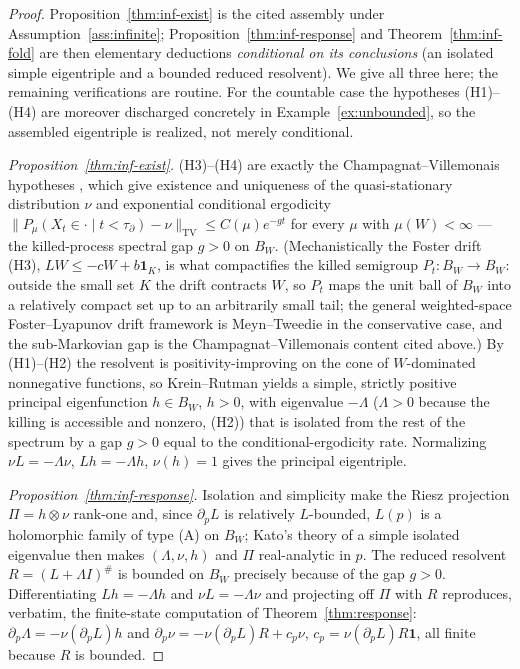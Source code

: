 \documentclass[11pt,reqno]{amsart}
\theoremstyle{plain}
\theoremstyle{definition}
\theoremstyle{remark}
\begin{document}
\begin{proof}
Proposition~\ref{thm:inf-exist} is the cited assembly under Assumption~\ref{ass:infinite};
Proposition~\ref{thm:inf-response} and Theorem~\ref{thm:inf-fold} are then elementary
deductions \emph{conditional on its conclusions} (an isolated simple eigentriple and a
bounded reduced resolvent). We give all three here; the remaining verifications are routine.
For the countable case the hypotheses (H1)--(H4) are moreover discharged concretely in
Example~\ref{ex:unbounded}, so the assembled eigentriple is realized, not merely conditional.

\emph{Proposition~\ref{thm:inf-exist}.} (H3)--(H4) are exactly the
Champagnat--Villemonais hypotheses
\cite{ChampagnatVillemonais2016,ChampagnatVillemonais2017}, which give existence and
uniqueness of the quasi-stationary distribution $\nu$ and exponential conditional
ergodicity $\|P_\mu(X_t\in\cdot\mid t<\tau_\partial)-\nu\|_{\mathrm{TV}}\le
C(\mu)e^{-gt}$ for every $\mu$ with $\mu(W)<\infty$ --- the killed-process spectral gap $g>0$ on
$B_W$. (Mechanistically the Foster drift (H3), $LW\le-cW+b\mathbf 1_K$, is what compactifies the
killed semigroup $P_t\colon B_W\to B_W$: outside the small set $K$ the drift contracts $W$, so $P_t$
maps the unit ball of $B_W$ into a relatively compact set up to an arbitrarily small tail; the general
weighted-space Foster--Lyapunov drift framework is Meyn--Tweedie \cite{MeynTweedie2009} in the
conservative case, and the sub-Markovian gap is the Champagnat--Villemonais content cited above.) By
(H1)--(H2) the resolvent is
positivity-improving on the cone of $W$-dominated nonnegative functions, so
Krein--Rutman \cite{KreinRutman1948} yields a simple, strictly positive principal
eigenfunction $h\in B_W$, $h>0$, with eigenvalue $-\Lambda$ ($\Lambda>0$ because the
killing is accessible and nonzero, (H2)) that is isolated from the rest of the
spectrum by a gap $g>0$ equal to the conditional-ergodicity rate. Normalizing
$\nu L=-\Lambda\nu$, $Lh=-\Lambda h$, $\nu(h)=1$ gives the principal eigentriple.

\emph{Proposition~\ref{thm:inf-response}.} Isolation and simplicity make the Riesz
projection $\Pi=h\otimes\nu$ rank-one and, since $\partial_pL$ is relatively
$L$-bounded, $L(p)$ is a holomorphic family of type (A) on $B_W$; Kato's theory of a
simple isolated eigenvalue \cite{Kato1995} then makes $(\Lambda,\nu,h)$ and $\Pi$
real-analytic in $p$. The reduced resolvent $R=(L+\Lambda I)^{\#}$ is bounded on
$B_W$ precisely because of the gap $g>0$. Differentiating $Lh=-\Lambda h$ and
$\nu L=-\Lambda\nu$ and projecting off $\Pi$ with $R$ reproduces, verbatim, the
finite-state computation of Theorem~\ref{thm:response}:
$\partial_p\Lambda=-\nu(\partial_pL)h$ and
$\partial_p\nu=-\nu(\partial_pL)R+c_p\nu$, $c_p=\nu(\partial_pL)R\mathbf 1$, all
finite because $R$ is bounded.


\end{proof}
\end{document}
